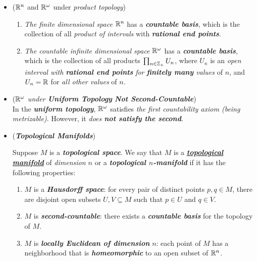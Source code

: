 \documentclass[11pt]{article}
\begin{document}
\begin{itemize}
\item \begin{example} (${\mathbb R}^n$ and ${\mathbb R}^{\omega}$ under \emph{product topology})
\begin{enumerate}
\item \emph{The finite dimensional space} ${\mathbb R}^n$ has a \emph{\textbf{countable basis}}, which is the collection of all \emph{product of intervals}  with \emph{\textbf{rational end points}}.
\item \emph{The countable infinite dimensional space} ${\mathbb R}^\omega$ has a \emph{\textbf{countable basis}}, which is the
collection of all products $\prod_{n\in {\mathbb Z}_{+}} U_n$, where $U_n$ is an \emph{open interval with \textbf{rational end points}} \emph{for \textbf{finitely many} values} of $n$, and $U_n = {\mathbb R}$ for \emph{all other values} of $n$.
\end{enumerate}
\end{example}

\item \begin{example}  (\emph{${\mathbb R}^{\omega}$ under \textbf{Uniform Topology} \textbf{Not Second-Countable}})\\
In the \emph{\textbf{uniform topology}}, ${\mathbb R}^{\omega}$ satisfies \emph{the first countability axiom (being metrizable)}. However, it \emph{does \textbf{not satisfy the second}}. 
\end{example}

\item \begin{example} (\emph{\textbf{Topological Manifolds}})
 \begin{definition}
Suppose $M$ is a \emph{\textbf{topological space}}. We say that $M$ is a \underline{\emph{\textbf{topological manifold}}} of \emph{dimension $n$} or a \emph{\textbf{topological $n$-manifold}} if it has the following properties:
\begin{enumerate}
\item $M$ is a \emph{\textbf{Hausdorff space}}: for every pair of distinct points $p, q \in M$, there are disjoint open subsets $U, V \subseteq M$ such that $p \in U$ and $q \in V$.
\item $M$ is \emph{\textbf{second-countable}}: there exists a \emph{\textbf{countable basis}} for the topology of $M$.
\item $M$ is \emph{\textbf{locally Euclidean of dimension}} $n$: each point of $M$ has a neighborhood that is \emph{\textbf{homeomorphic}} to an open subset of ${\mathbb R}^n$. 
\end{enumerate}
\end{definition}
\end{example}


\end{itemize}
\end{document}
